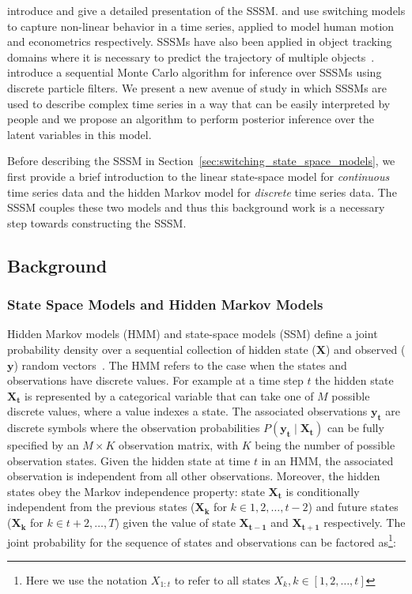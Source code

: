 \citet{ghahramani2000variational} introduce and give a detailed presentation of the SSSM. \citet{pavlovic2001learning} and \citet{giordani2007unified} use switching models to capture non-linear behavior in a time series, applied to model human motion and econometrics respectively. SSSMs have also been applied in object tracking domains where it is necessary to predict the trajectory of multiple objects~\citep{fox2007hierarchical}. \citet{whiteley2010efficient} introduce a sequential Monte Carlo algorithm for inference over SSSMs using discrete particle filters. We present a new avenue of study in which SSSMs are used to describe complex time series in a way that can be easily interpreted by people and we propose an algorithm to perform posterior inference over the latent variables in this model.

Before describing the SSSM in Section~\ref{sec:switching_state_space_models}, we first provide a brief introduction to the linear state-space model for \textit{continuous} time series data and the hidden Markov model for \textit{discrete} time series data. The SSSM couples these two models and thus this background work is a necessary step towards constructing the SSSM.


\subsection{Background}
\subsubsection{State Space Models and Hidden Markov Models}\label{sec:state_space_and_hidden_markov_models}
Hidden Markov models (HMM) and state-space models (SSM) define a joint probability density over a sequential collection of hidden state ($\mathbf{X}$) and observed ($\mathbf{y}$) random vectors~\citep{ghahramani2001introduction,shumway2000time}. The HMM refers to the case when the states and observations have discrete values. For example at a time step $t$ the hidden state $\mathbf{X_t}$ is represented by a categorical variable that can take one of $M$ possible discrete values, where a value indexes a state. The associated observations $\mathbf{y_t}$ are discrete symbols where the observation probabilities $P(\mathbf{y_t} \mid \mathbf{X_t})$ can be fully specified by an $M \times K$ observation matrix, with $K$ being the number of possible observation states. Given the hidden state at time $t$ in an HMM, the associated observation is independent from all other observations. Moreover, the hidden states obey the Markov independence property: state $\mathbf{X_{t}}$ is conditionally independent from the previous states ($\mathbf{X_{k}}$ for $k \in 1,2, \hdots, t-2$) and future states ($\mathbf{X_{k}}$ for $k \in t+2, \hdots, T$) given the value of state $\mathbf{X_{t-1}}$ and $\mathbf{X_{t+1}}$ respectively. The joint probability for the sequence of states and observations can be factored as\footnote{Here we use the notation $X_{1:t}$ to refer to all states $X_k, k \in [1,2,\hdots,t]$}:

